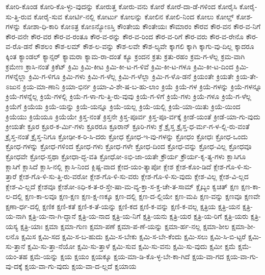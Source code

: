 {ಕೋರಿ-ಕೊಂಡ
ಕೋರಿ-ಕೊ-ಳ್ಳು-ವುದನ್ನು
ಕೋರುತ್ತ
ಕೋರು-ವನು
ಕೋರೆ
ಕೋರೆ-ದಾ-ಡೆ-ಗಳಿಂದ
ಕೋರೈಸಿ
ಕೋರೈ-ಸು-ತ್ತಿ-ರುವ
ಕೋರೈ-ಸುವ
ಕೋರ್ಟಿ-ನಲ್ಲಿ
ಕೋರ್ಟು
ಕೋಲನ್ನು
ಕೋಲಿನ
ಕೋಲಿ-ನಿಂದ
ಕೋಲು
ಕೋಲ್ಡ್
ಕೋಶ-ಗಳನ್ನು
ಕೋಶಾ-ಧಿ-ಕಾರಿ
ಕೋಽತ್ರ
ಕೋಽನ್ಯೋಽಸ್ತಿ
ಕೌಂತೇಯ
ಕೌಂತೇಯಃ
ಕೌಮಾರಂ
ಕೌರವ
ಕೌರ-ವನ
ಕೌರ-ವ-ನಿಗೆ
ಕೌರ-ವನೇ
ಕೌರ-ವರ
ಕೌರ-ವ-ರಂತೂ
ಕೌರ-ವ-ರನ್ನು
ಕೌರ-ವ-ರಿಂದ
ಕೌರ-ವ-ರಿಗೆ
ಕೌರ-ವರು
ಕೌರ-ವ-ರೇನೊ
ಕೌರ-ವ-ರೊ-ಡನೆ
ಕೌಶಲಂ
ಕೌಶ-ಲಮ್
ಕೌಶ-ಲ-ವನ್ನು
ಕೌಶ-ಲವೇ
ಕೌಶ-ಲ್ಯವೇ
ಕ್ಕಾಗಲಿ
ಕ್ಕಾಗಿ
ಕ್ಕಾಗು-ವು-ದಿಲ್ಲ
ಕ್ಕಾದರೂ
ಕ್ಕಿಂತ
ಕ್ಯಾಂಡಲ್
ಕ್ಯಾನ್ಸರ್
ಕ್ಯಾಮರಾ
ಕ್ಯಾಮ-ರಾ-ದಂತೆ
ಕ್ಯೂ
ಕ್ರಂದನ
ಕ್ರತು
ಕ್ರತು-ರಹಂ
ಕ್ರಮ-ಗ-ಳೆಲ್ಲ
ಕ್ರಮ-ವಾಗಿ
ಕ್ರಮೇಣ
ಕ್ರಾಸಿ-ನಂತೆ
ಕ್ರಿಕೆಟ್
ಕ್ರಿಮಿ
ಕ್ರಿಮಿ-ಕೀಟ
ಕ್ರಿಮಿ-ಕೀ-ಟ-ಗ-ಳಿವೆ
ಕ್ರಿಮಿ-ಕೀ-ಟ-ಗಳೂ
ಕ್ರಿಮಿ-ಕೀ-ಟ-ದಿಂದ
ಕ್ರಿಮಿ-ಗಳನ್ನೆಲ್ಲಾ
ಕ್ರಿಮಿ-ಗ-ಳಿಗೂ
ಕ್ರಿಮಿ-ಗಳು
ಕ್ರಿಮಿ-ಗ-ಳೆಲ್ಲ
ಕ್ರಿಮಿ-ಗ-ಳೆಲ್ಲಾ
ಕ್ರಿಮಿ-ಗ-ಳೊ-ಡನೆ
ಕ್ರಿಯಂತೇ
ಕ್ರಿಯತೇ
ಕ್ರಿಯ-ತೇ-ಽಜುನ
ಕ್ರಿಯ-ಮಾ-ಣಾನಿ
ಕ್ರಿಯಾ-ಭಿರ್ನ
ಕ್ರಿಯಾ-ವಿ-ಶೇ-ಷ-ಬ-ಹು-ಲಾಂ
ಕ್ರಿಯೆ
ಕ್ರಿಯೆ-ಗಳ
ಕ್ರಿಯೆ-ಗಳನ್ನು
ಕ್ರಿಯೆ-ಗಳನ್ನೂ
ಕ್ರಿಯೆ-ಗಳನ್ನೆಲ್ಲ
ಕ್ರಿಯೆ-ಗಳಲ್ಲಿ
ಕ್ರಿಯೆ-ಗ-ಳಾ-ಗು-ತ್ತಿ-ರು-ವುವು
ಕ್ರಿಯೆ-ಗ-ಳಿಗೆ
ಕ್ರಿಯೆ-ಗಳು
ಕ್ರಿಯೆ-ಗಳೂ
ಕ್ರಿಯೆ-ಗ-ಳೆಲ್ಲ
ಕ್ರಿಯೆಗೆ
ಕ್ರಿಯೆಯ
ಕ್ರಿಯೆ-ಯನ್ನು
ಕ್ರಿಯೆ-ಯನ್ನೂ
ಕ್ರಿಯೆ-ಯಲ್ಲ
ಕ್ರಿಯೆ-ಯಲ್ಲಿ
ಕ್ರಿಯೆ-ಯಾ-ಯಿತು
ಕ್ರಿಯೆ-ಯಿಂದ
ಕ್ರಿಯೆಯು
ಕ್ರಿಯೆಯೂ
ಕ್ರಿಯೆಯೇ
ಕ್ರಿಸ್ತ-ನಂತೆ
ಕ್ರಿಸ್ತನೇ
ಕ್ರಿಸ್ತ-ಪೂರ್ವ
ಕ್ರಿಸ್ತ-ಪೂ-ರ್ವಕ್ಕೆ
ಕ್ರೀಡೆ-ಯಂತೆ
ಕ್ರೀಡೆ-ಯಾ-ಗು-ವುದು
ಕ್ರೀಯತೇ
ಕ್ರೂರ
ಕ್ರೂರ-ಕ-ರ್ಮಿ-ಗಳು
ಕ್ರೂರರೂ
ಕ್ರೂರಾನ್
ಕ್ರೂರಿ-ಗಳು
ಕ್ರೆ
ಕ್ರೈಸ್ತ
ಕ್ರೈಸ್ತ-ಧ-ರ್ಮ-ಗ-ಳ-ಲ್ಲಿ-ರು-ವಂತೆ
ಕ್ರೈಸ್ತ-ನಂತೆ
ಕ್ರೈಸ್ತ-ನಿಗೂ
ಕ್ರೋಢೀ-ಕ-ರಿ-ಸಿ-ದರು
ಕ್ರೋಧ
ಕ್ರೋಧ-ಇ-ವು-ಗಳನ್ನು
ಕ್ರೋಧಂ
ಕ್ರೋಧಃ
ಕ್ರೋಧ-ಒಂದು
ಕ್ರೋಧ-ಗಳನ್ನು
ಕ್ರೋಧ-ಗಳಿಂದ
ಕ್ರೋಧ-ಗಳು
ಕ್ರೋಧ-ಗಳೇ
ಕ್ರೋಧ-ದಿಂದ
ಕ್ರೋಧ-ವನ್ನು
ಕ್ರೋಧ-ವಿಲ್ಲ
ಕ್ರೋಧವೂ
ಕ್ರೋಧವೇ
ಕ್ರೋಧ-ಸ್ತಥಾ
ಕ್ರೋಧಾ-ದ್ಭ-ವತಿ
ಕ್ರೋಧೋ-ಽಭಿ-ಜಾ-ಯತೇ
ಕ್ರೌರ್ಯ
ಕ್ರೌರ್ಯ-ಕೃ-ತ್ಯ-ಗಳು
ಕ್ಲಾಸಿಗೂ
ಕ್ಲಾಸಿಗೆ
ಕ್ಲಾಸಿದೆ
ಕ್ಲಾಸಿ-ನಲ್ಲಿ
ಕ್ಲಾಸಿ-ನಿಂದ
ಕ್ಲಿಷ್ಟ-ವಾದ
ಕ್ಲೇದ-ಯಂ-ತ್ಯಾಪೋ
ಕ್ಲೇಶ
ಕ್ಲೇಶ-ಕೊಂ-ಡಿದೆ
ಕ್ಲೇಶ-ಗೊ-ಳಿ-ಸು-ತ್ತಾರೆ
ಕ್ಲೇಶ-ಗೊ-ಳಿ-ಸು-ತ್ತಿ-ರು-ವರೋ
ಕ್ಲೇಶ-ಗೊ-ಳಿ-ಸು-ವರು
ಕ್ಲೇಶ-ಗೊ-ಳಿ-ಸು-ವುದು
ಕ್ಲೇಶ-ವಿಲ್ಲ
ಕ್ಲೇಶ-ವಿ-ಲ್ಲದ
ಕ್ಲೇಶ-ವಿ-ಲ್ಲದೆ
ಕ್ಲೇಶವೂ
ಕ್ಲೇಶೋ-ಽಧಿ-ಕ-ತ-ರ-ಸ್ತೇ-ಷಾ-ಮ-ವ್ಯ-ಕ್ತಾ-ಸ-ಕ್ತ-ಚೇ-ತ-ಸಾಮ್
ಕ್ಲೈಬ್ಯಂ
ಕ್ವಚಿತ್
ಕ್ಷಣ
ಕ್ಷಣ-ಕಾ-ಲ-ದಲ್ಲಿ
ಕ್ಷಣ-ಕಾ-ಲವೂ
ಕ್ಷಣ-ಕ್ಷಣ
ಕ್ಷಣ-ಕ್ಷ-ಣಕ್ಕೂ
ಕ್ಷಣ-ದಲ್ಲಿ
ಕ್ಷಣ-ದ-ಲ್ಲಿಯೇ
ಕ್ಷಣ-ಮಪಿ
ಕ್ಷಣ-ವನ್ನು
ಕ್ಷಣವೂ
ಕ್ಷಣವೇ
ಕ್ಷಣಾ-ರ್ಧ-ದಲ್ಲಿ
ಕ್ಷಣಿಕ
ಕ್ಷಣಿ-ಕತೆ
ಕ್ಷಣಿ-ಕ-ತೆ-ಯನ್ನು
ಕ್ಷಣಿ-ಕದ
ಕ್ಷಣಿ-ಕ-ವನ್ನು
ಕ್ಷಣಿ-ಕ-ವಲ್ಲ
ಕ್ಷತ್ರಿಯ
ಕ್ಷತ್ರಿ-ಯನ
ಕ್ಷತ್ರಿ-ಯ-ನಾಗಿ
ಕ್ಷತ್ರಿ-ಯ-ನಾ-ಗಿ-ದ್ದಾನೆ
ಕ್ಷತ್ರಿ-ಯ-ನಾದ
ಕ್ಷತ್ರಿ-ಯ-ನಿಗೆ
ಕ್ಷತ್ರಿ-ಯನು
ಕ್ಷತ್ರಿ-ಯರ
ಕ್ಷತ್ರಿ-ಯ-ರಿಗೆ
ಕ್ಷತ್ರಿ-ಯರು
ಕ್ಷತ್ರಿ-ಯಸ್ಯ
ಕ್ಷತ್ರಿ-ಯಾಃ
ಕ್ಷಮಾ
ಕ್ಷಮಾ-ಗುಣ
ಕ್ಷಮಾ-ಪಣೆ
ಕ್ಷಮಾ-ಪ-ಣೆ-ಯನ್ನು
ಕ್ಷಮಾ-ರ್ಹ-ನಲ್ಲ
ಕ್ಷಮಾ-ಶೀಲ
ಕ್ಷಮಾ-ಶೀ-ಲನೊ
ಕ್ಷಮಿಸ
ಕ್ಷಮಿ-ಸದ
ಕ್ಷಮಿ-ಸ-ಬ-ಹುದು
ಕ್ಷಮಿ-ಸ-ಬೇಕು
ಕ್ಷಮಿ-ಸ-ಬೇ-ಕೆಂದು
ಕ್ಷಮಿ-ಸಲು
ಕ್ಷಮಿ-ಸಿ-ಬಿ-ಟ್ಟರೆ
ಕ್ಷಮಿ-ಸು-ತ್ತಾನೆ
ಕ್ಷಮಿ-ಸು-ತ್ತಾ-ನೆಯೋ
ಕ್ಷಮಿ-ಸು-ತ್ತಾಳೆ
ಕ್ಷಮಿ-ಸುವ
ಕ್ಷಮಿ-ಸು-ವನು
ಕ್ಷಮಿ-ಸು-ವುದು
ಕ್ಷಮೀ
ಕ್ಷಮೆ
ಕ್ಷಮೆ-ಯಂ-ತಹ
ಕ್ಷಮೆ-ಯನ್ನು
ಕ್ಷಯ
ಕ್ಷಯಂ
ಕ್ಷಯಕ್ಕೂ
ಕ್ಷಯ-ಮಾ-ಡಿ-ಕೊ-ಳ್ಳ-ಬೇ-ಕಾ-ಗಿದೆ
ಕ್ಷಯ-ವಾ-ಗದ
ಕ್ಷಯ-ವಾ-ಗು-ವು-ದಕ್ಕೆ
ಕ್ಷಯ-ವಾ-ಗು-ವುದು
ಕ್ಷಯ-ವಾ-ದ-ಲ್ಲದೆ
ಕ್ಷಯಾಯ
}
